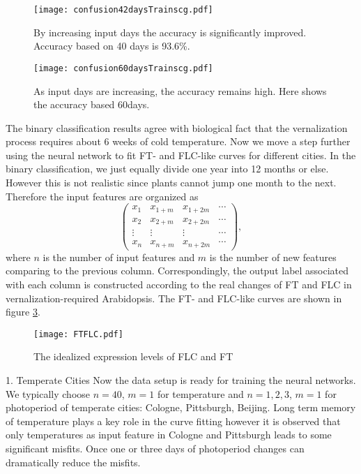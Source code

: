 \documentclass[paper=a4, fontsize=12pt]{scrartcl}	%
\numberwithin{equation}{section}					%
\numberwithin{figure}{section}					%
\numberwithin{table}{section}					%
\begin{document}
\begin{figure}[H]
\centering
\texttt{[image: confusion42daysTrainscg.pdf]}
\caption{By increasing input days the accuracy is significantly improved. Accuracy based on 40 days is 93.6\%.}
\label{fig: day40}
\end{figure}

\begin{figure}[H]
\centering
\texttt{[image: confusion60daysTrainscg.pdf]}
\caption{As input days are increasing, the accuracy remains high. Here shows the accuracy based 60days.}
\label{fig: day60}
\end{figure}

The binary classification results agree with biological fact that the vernalization process requires about 6 weeks of cold temperature. Now we move a step further using the neural network to fit FT- and FLC-like curves for different cities. In the binary classification, we just equally divide one year into 12 months or else. However this is not realistic since plants cannot jump one month to the next. Therefore the input features are organized as
\begin{equation*}
\begin{pmatrix}
x_{1} & x_{1+m} & x_{1+2m} & \cdots\\
x_{2} & x_{2+m} & x_{2+2m} & \cdots\\
\vdots & \vdots & \vdots & \cdots\\
x_n & x_{n+m} & x_{n + 2m} & \cdots
\end{pmatrix},
\end{equation*}
where $n$ is the number of input features and $m$ is the number of new features comparing to the previous column. Correspondingly, the output label associated with each column is constructed according to the real changes of FT and FLC in vernalization-required Arabidopsis. The FT- and FLC-like curves are shown in figure \ref{fig:ftflc}. 

\begin{figure}[H]
\centering
\texttt{[image: FTFLC.pdf]}
\caption{The idealized expression levels of FLC and FT}
\label{fig:ftflc}
\end{figure}

1. Temperate Cities
Now the data setup is ready for training the neural networks. We typically choose $n=40$, $m=1$ for temperature and $n=1, 2, 3$, $m=1$ for photoperiod of temperate cities: Cologne, Pittsburgh, Beijing. Long term memory of temperature plays a key role in the curve fitting however it is observed that only temperatures as input feature in Cologne and Pittsburgh leads to some significant misfits. Once one or three days of photoperiod changes can dramatically reduce the misfits. 
\end{document}
